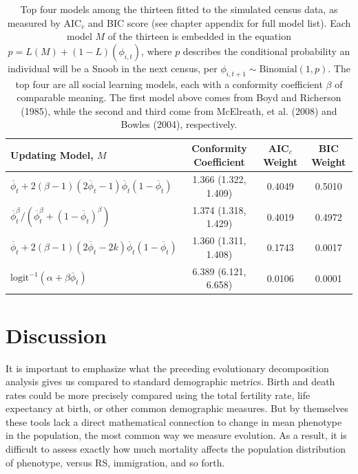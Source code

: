 \begin{table}[htbp]
  \centering
    \begin{footnotesize}
    \begin{tabular}{lccc}
    Updating Model, $M$ & Conformity Coefficient & AIC$_c$ Weight & BIC Weight \\
\hline
\hline
    $\overline{\phi}_t + 2(\beta-1)(2\overline{\phi}_t - 1)\overline{\phi}_t(1-\overline{\phi}_t)$ & 1.366 (1.322, 1.409) & 0.4049 & 0.5010 \\
    $\overline{\phi}_t^{\beta} / (\overline{\phi}_t^{\beta} + (1-\overline{\phi}_t)^{\beta})$ & 1.374 (1.318, 1.429) & 0.4019 & 0.4972 \\
    $\overline{\phi}_t + 2(\beta-1)(2\overline{\phi}_t - 2k)\overline{\phi}_t(1-\overline{\phi}_t)$ & 1.360 (1.311, 1.408) & 0.1743 & 0.0017 \\
    $\mathrm{logit}^{-1}(\alpha + \beta \overline{\phi}_t)$ & 6.389 (6.121, 6.658) & 0.0106 & 0.0001 \\
    \hline
    \end{tabular}%
    \caption{Top four models among the thirteen fitted to the simulated census data, as measured by AIC$_c$ and BIC score (see chapter appendix for full model list).  Each model $M$ of the thirteen is embedded in the equation $p=L(M) + (1-L)(\phi_{i,t})$, where $p$ describes the conditional probability an individual will be a Snoob in the next census, per $\phi_{i, t+1} \sim \mathrm{Binomial}(1, p)$.  The top four are all social learning models, each with a conformity coefficient $\beta$ of comparable meaning.  The first model above comes from Boyd and Richerson (1985), while the second and third come from McElreath, et al. (2008) and Bowles (2004), respectively.} 
		\label{tab:Learning}
    \end{footnotesize}

\end{table}

\newpage
\section{Discussion}

It is important to emphasize what the preceding evolutionary decomposition analysis gives us compared to standard demographic metrics. Birth and death rates could be more precisely compared using the total fertility rate, life expectancy at birth, or other common demographic measures. But by themselves these tools lack a direct mathematical connection to change in mean phenotype in the population, the most common way we measure evolution.  As a result, it is difficult to assess exactly how much mortality affects the population distribution of phenotype, versus RS, immigration, and so forth.  


